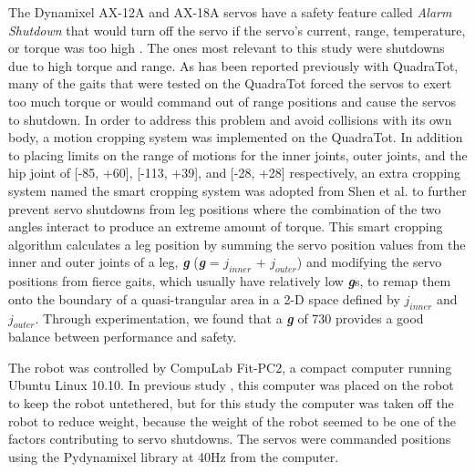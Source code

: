 The Dynamixel AX-12A and AX-18A servos have a safety feature called \emph{Alarm Shutdown} that would turn off the servo if the servo's current, range, temperature, or torque was too high \cite{robotis}. 
The ones most relevant to this study were shutdowns due to high torque and range. 
As has been reported previously with QuadraTot\cite{yos:clune}, many of the gaits that were tested on the QuadraTot forced the servos to exert too much torque or would command out of range positions and cause the servos to shutdown. In order to address this problem and avoid collisions with its own body, a motion cropping system was implemented on the QuadraTot. 
In addition to placing limits on the range of motions for the inner joints, outer joints, and the hip joint of [-85\degree, +60\degree], [-113\degree, +39\degree], and [-28\degree, +28\degree] respectively, an extra cropping system named the smart cropping system was adopted from Shen et al. \cite{haocheng} to further prevent servo shutdowns from leg positions where the combination of the two angles interact to produce an extreme amount of torque. This smart cropping algorithm calculates a leg position by summing the servo position values from the inner and outer joints of a leg, \emph{\textbf{g}} (\emph{\textbf{g}} = $j_{inner}$ + $j_{outer}$) %
and modifying the servo positions from fierce gaits, which usually have relatively low \emph{\textbf{g}}s, to remap them onto the boundary of a quasi-trangular area in a 2-D space defined by $j_{inner}$ and $j_{outer}$. %
Through experimentation, we found that a \emph{\textbf{g}} of 730 provides a good balance between performance and safety. %


The robot was controlled by CompuLab Fit-PC2, a compact computer running Ubuntu Linux 10.10. 
In previous study \cite{yos:clune}, this computer was placed on the robot to keep the robot untethered, but for this study the computer was taken off the robot to reduce weight, because the weight of the robot seemed to be one of the factors contributing to servo shutdowns.
The servos were commanded positions using the Pydynamixel library at 40Hz from the computer. 



